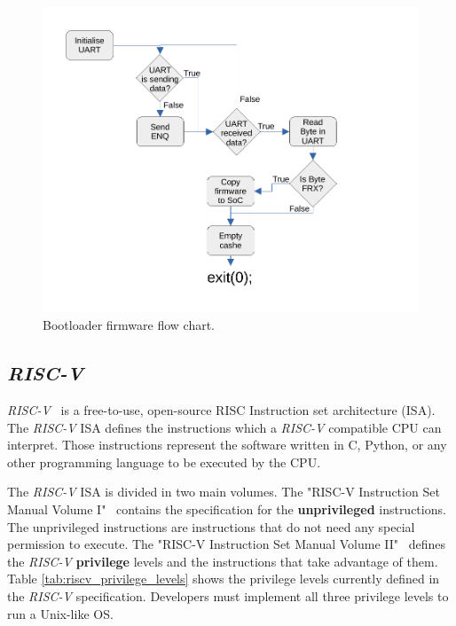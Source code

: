 \begin{figure}[!h]
    \centering
    \includegraphics[width=\linewidth]{../images/boot_flow.pdf}
    \caption{Bootloader firmware flow chart.}
    \label{fig:boot_flow}
\end{figure}

\subsection{\textit{RISC-V}}

\textit{RISC-V}~\cite{asanovic2014instruction} is a free-to-use, open-source RISC Instruction set architecture (ISA). The \textit{RISC-V} ISA defines the instructions which a \textit{RISC-V} compatible CPU can interpret. Those instructions represent the software written in C, Python, or any other programming language to be executed by the CPU.

The \textit{RISC-V} ISA is divided in two main volumes. The "RISC-V Instruction Set Manual Volume I"~\cite{riscv_unprivilege} contains the specification for the \textbf{unprivileged} instructions. The unprivileged instructions are instructions that do not need any special permission to execute. The "RISC-V Instruction Set Manual Volume II"~\cite{riscv_privilege} defines the \textit{RISC-V} \textbf{privilege} levels and the instructions that take advantage of them. Table \ref{tab:riscv_privilege_levels} shows the privilege levels currently defined in the \textit{RISC-V} specification. Developers must implement all three privilege levels to run a Unix-like OS.

